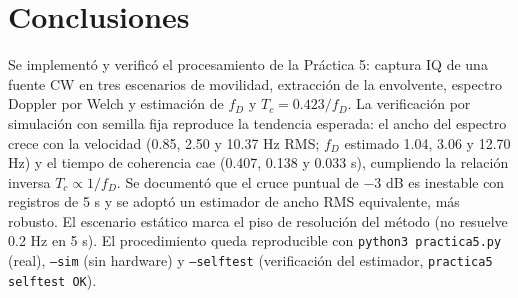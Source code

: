 \documentclass[11pt,a4paper]{article}
\begin{document}
\section{Conclusiones}

Se implementó y verificó el procesamiento de la Práctica 5: captura IQ de una fuente CW en tres escenarios de movilidad, extracción de la envolvente, espectro Doppler por Welch y estimación de $f_D$ y $T_c = 0.423/f_D$. La verificación por simulación con semilla fija reproduce la tendencia esperada: el ancho del espectro crece con la velocidad (0.85, 2.50 y 10.37 Hz RMS; $f_D$ estimado 1.04, 3.06 y 12.70 Hz) y el tiempo de coherencia cae (0.407, 0.138 y 0.033 s), cumpliendo la relación inversa $T_c \propto 1/f_D$. Se documentó que el cruce puntual de $-$3 dB es inestable con registros de 5 s y se adoptó un estimador de ancho RMS equivalente, más robusto. El escenario estático marca el piso de resolución del método (no resuelve 0.2 Hz en 5 s). El procedimiento queda reproducible con \texttt{python3 practica5.py} (real), \texttt{--sim} (sin hardware) y \texttt{--selftest} (verificación del estimador, \texttt{practica5 selftest OK}).
\end{document}
